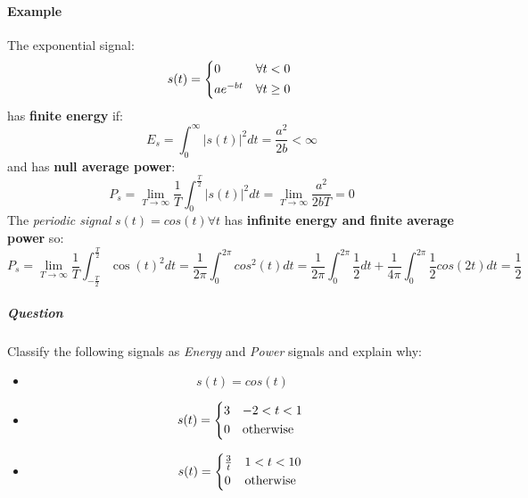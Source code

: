 \documentclass[10pt,a4paper]{report}
\theoremstyle{definition}
\begin{document}
\paragraph{Example}
The exponential signal:
\begin{equation}
	s(t) =
	 \begin{cases*}
		0 & $\forall t < 0$ \\
		ae^{-bt}  & $\forall t \geq 0$
	\end{cases*}
\end{equation}
has \textbf{finite energy} if:
\begin{equation}
	E_{s} = \int_{0}^{\infty} |s(t)|^{2}dt = \frac{a^{2}}{2b} < \infty
\end{equation}
and has \textbf{null average power}:
\begin{equation}
	P_{s} = \lim_{T \to \infty} \frac{1}{T}\int_{0}^{\frac{T}{2}}|s(t)|^{2}dt = \lim_{T \to \infty} \frac{a^{2}}{2bT} = 0
\end{equation}
The \textit{periodic signal} $s(t) = cos(t) \forall t$ has \textbf{infinite energy and finite average power} so:
\begin{equation}
	P_{s} = \lim_{T \to \infty} \frac{1}{T}\int_{-\frac{T}{2}}^{\frac{T}{2}}\cos(t)^{2}dt =  \frac{1}{2\pi} \int_{0}^{2\pi} cos^{2}(t)dt = \frac{1}{2\pi} \int_{0}^{2\pi}\frac{1}{2}dt + \frac{1}{4\pi}\int_{0}^{2\pi}\frac{1}{2}cos(2t)dt = \frac{1}{2}
\end{equation}

\subparagraph{Question}
Classify the following signals as \textit{Energy} and \textit{Power} signals and explain why:
\begin{itemize}
	\item \begin{equation}
		s(t) = cos(t)
	\end{equation}

	\item \begin{equation}
		s(t) = 
		 \begin{cases*}
			3 & $-2 < t < 1$ \\
			0  & otherwise
		\end{cases*}
	\end{equation}

	\item \begin{equation}
		s(t) = 
			\begin{cases*}
			\frac{3}{t} & $1 < t < 10$ \\
			0  & otherwise
		\end{cases*}
	\end{equation}
\end{itemize}
\end{document}
